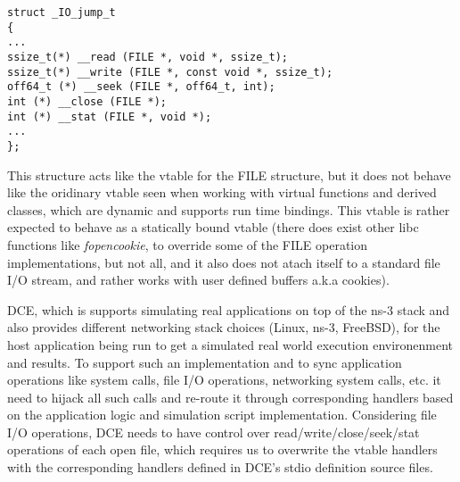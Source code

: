 \documentclass{sig-alternate}
\begin{document}
\begin{lstlisting}[style=CStyle]     
struct _IO_jump_t
{
...
ssize_t(*) __read (FILE *, void *, ssize_t);
ssize_t(*) __write (FILE *, const void *, ssize_t);
off64_t (*) __seek (FILE *, off64_t, int);
int (*) __close (FILE *);
int (*) __stat (FILE *, void *);
...
};
\end{lstlisting}

This structure acts like the vtable for the FILE structure, but it does not behave like the oridinary vtable seen when working with virtual functions 
and derived classes, which are dynamic and supports run time bindings. This vtable is rather expected to behave as a statically bound vtable (there does 
exist other libc functions like \textit{fopencookie}, to override some of the FILE operation implementations, but not all, and it also does not atach 
itself to a standard file I/O stream, and rather works with user defined buffers a.k.a cookies). 

DCE, which is supports simulating real applications on top of the ns-3 stack and also provides different networking stack choices (Linux, ns-3, FreeBSD),
for the host application being run to get a simulated real world execution environenment and results. To support such an implementation and to sync 
application operations like system calls, file I/O operations, networking system calls, etc. it need to hijack all such calls and re-route it through 
corresponding handlers based on the application logic and simulation script implementation. Considering file I/O operations, DCE needs to have control 
over read/write/close/seek/stat operations of each open file, which requires us to overwrite the vtable handlers with the corresponding handlers defined 
in DCE's stdio definition source files. 
\end{document}

